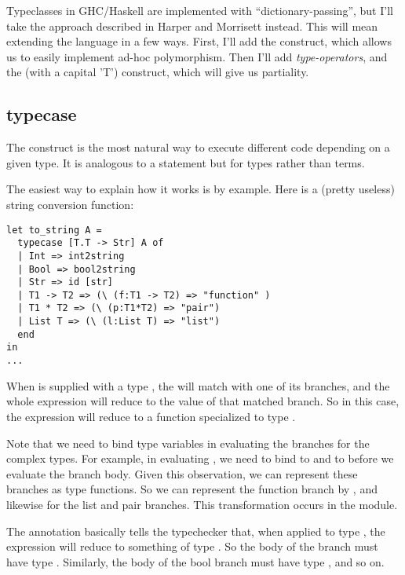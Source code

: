\documentclass[pageno]{jpaper}
\begin{document}
{{{Typeclasses in GHC/Haskell are implemented with ``dictionary-passing'', but I'll take the approach described
in Harper and Morrisett \cite{harper-typecase} instead. This will mean extending the language in a few ways.  First, I'll add the
 construct, which allows us to easily implement ad-hoc polymorphism. Then I'll add
\textit{type-operators}, and the  (with a capital 'T') construct, which will give us
partiality.

\subsection{typecase}
The  construct is the most natural way to execute different code depending on a
given type. It is analogous to a  statement but for types rather than terms.

The easiest way to explain how it works is by example. Here is a (pretty useless) string conversion function:

\begin{lstlisting}[mathescape]
let to_string A =
  typecase [T.T -> Str] A of
  | Int => int2string
  | Bool => bool2string
  | Str => id [str]
  | T1 -> T2 => (\ (f:T1 -> T2) => "function" )
  | T1 * T2 => (\ (p:T1*T2) => "pair")
  | List T => (\ (l:List T) => "list")
  end
in
...
\end{lstlisting}

When  is supplied with a type , the  will match 
with one of its branches, and the whole expression will reduce to the value of that matched branch.
So in this case, the expression will reduce to a  function specialized to
type .

Note that we need to bind type variables in evaluating the branches for the complex types. For example,
in evaluating , we need to bind  to  and  to  before we evaluate the branch body. 
Given this observation, we can represent these branches as type functions. So we can represent the function branch by
, and likewise for the list and pair branches. This transformation
occurs in the  module.

The annotation \lsti{[T.T -> Str]} basically tells the typechecker that, when applied to type \lsti{[T]}, the  expression will reduce to something of type . 
So the body of the  branch must have type .
Similarly, the body of the bool branch must have type , and so on.

}}}
\end{document}
